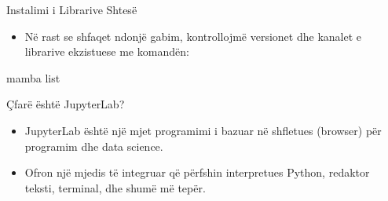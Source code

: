 \documentclass[
  ignorenonframetext,
]{beamer}
\newenvironment{Shaded}{\begin{snugshade}}{\end{snugshade}}
\newcommand{\NormalTok}[1]{#1}
\providecommand{\tightlist}{%
  \setlength{\itemsep}{0pt}\setlength{\parskip}{0pt}}
\begin{document}
\begin{frame}[fragile]{Instalimi i Librarive Shtesë}
\protect\hypertarget{instalimi-i-librarive-shtesuxeb-2}{}
\begin{itemize}
\tightlist
\item
  Në rast se shfaqet ndonjë gabim, kontrollojmë versionet dhe kanalet e
  librarive ekzistuese me komandën:
\end{itemize}

\begin{Shaded}
\begin{Highlighting}[]
\NormalTok{mamba list}
\end{Highlighting}
\end{Shaded}
\end{frame}

\begin{frame}{Çfarë është JupyterLab?}
\protect\hypertarget{uxe7faruxeb-uxebshtuxeb-jupyterlab}{}
\begin{itemize}
\item
  JupyterLab është një mjet programimi i bazuar në shfletues (browser)
  për programim dhe data science.
\item
  Ofron një mjedis të integruar që përfshin interpretues Python,
  redaktor teksti, terminal, dhe shumë më tepër.
\end{itemize}
\end{frame}
\end{document}
